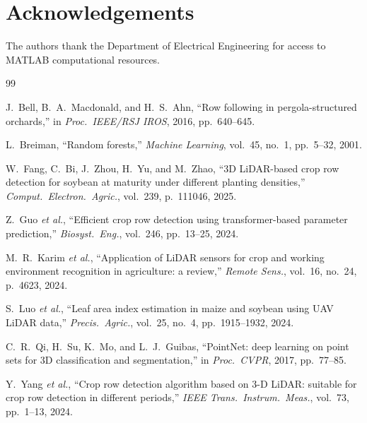 \documentclass[12pt,a4paper]{article}
\begin{document}
\section*{Acknowledgements}

The authors thank the Department of Electrical Engineering for access to MATLAB
computational resources.

\begin{thebibliography}{99}

J.~Bell, B.~A.~Macdonald, and H.~S.~Ahn,
``Row following in pergola-structured orchards,''
in \textit{Proc.\ IEEE/RSJ IROS}, 2016, pp.\ 640--645.

L.~Breiman,
``Random forests,''
\textit{Machine Learning}, vol.~45, no.~1, pp.~5--32, 2001.

W.~Fang, C.~Bi, J.~Zhou, H.~Yu, and M.~Zhao,
``3D LiDAR-based crop row detection for soybean at maturity under different planting densities,''
\textit{Comput.\ Electron.\ Agric.}, vol.~239, p.~111046, 2025.

Z.~Guo \textit{et al.},
``Efficient crop row detection using transformer-based parameter prediction,''
\textit{Biosyst.\ Eng.}, vol.~246, pp.~13--25, 2024.

M.~R.~Karim \textit{et al.},
``Application of LiDAR sensors for crop and working environment recognition in agriculture: a review,''
\textit{Remote Sens.}, vol.~16, no.~24, p.~4623, 2024.

S.~Luo \textit{et al.},
``Leaf area index estimation in maize and soybean using UAV LiDAR data,''
\textit{Precis.\ Agric.}, vol.~25, no.~4, pp.~1915--1932, 2024.

C.~R.~Qi, H.~Su, K.~Mo, and L.~J.~Guibas,
``PointNet: deep learning on point sets for 3D classification and segmentation,''
in \textit{Proc.\ CVPR}, 2017, pp.~77--85.

Y.~Yang \textit{et al.},
``Crop row detection algorithm based on 3-D LiDAR: suitable for crop row detection in different periods,''
\textit{IEEE Trans.\ Instrum.\ Meas.}, vol.~73, pp.~1--13, 2024.


\end{thebibliography}
\end{document}
